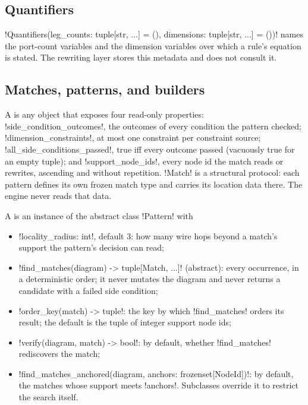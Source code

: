 \subsection{Quantifiers}

\py!Quantifiers(leg_counts: tuple[str, ...] = (), dimensions: tuple[str, ...] = ())! names the
port-count variables and the dimension variables over which a rule's equation is stated. The
rewriting layer stores this metadata and does not consult it.

\subsection{Matches, patterns, and builders}

\begin{definition}[Match]\label{def:rewriting-match}
A  is any object that exposes four read-only properties:
\py!side_condition_outcomes!, the outcomes of every condition the pattern checked;
\py!dimension_constraints!, at most one constraint per constraint source;
\py!all_side_conditions_passed!, true iff every outcome passed (vacuously true for an empty
tuple); and \py!support_node_ids!, every node id the match reads or rewrites, ascending and
without repetition. \py!Match! is a structural protocol: each pattern defines its own frozen
match type and carries its location data there. The engine never reads that data.
\end{definition}

\begin{definition}[Pattern]\label{def:rewriting-pattern}
A  is an instance of the abstract class \py!Pattern! with
\begin{itemize}
\item \py!locality_radius: int!, default $3$: how many wire hops beyond a match's support the
  pattern's decision can read;
\item \py!find_matches(diagram) -> tuple[Match, ...]! (abstract): every occurrence, in a
  deterministic order; it never mutates the diagram and never returns a candidate with a failed
  side condition;
\item \py!order_key(match) -> tuple!: the key by which \py!find_matches! orders its result; the
  default is the tuple of integer support node ids;
\item \py!verify(diagram, match) -> bool!: by default, whether \py!find_matches! rediscovers the
  match;
\item \py!find_matches_anchored(diagram, anchors: frozenset[NodeId])!: by default, the matches
  whose support meets \py!anchors!. Subclasses override it to restrict the search itself.
\end{itemize}
\end{definition}

